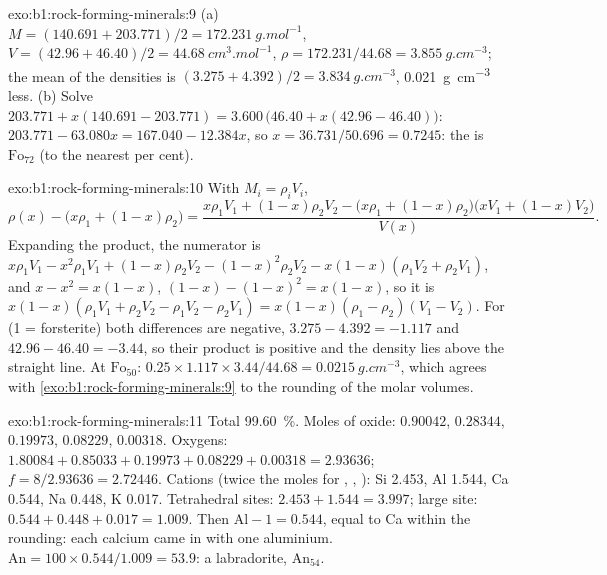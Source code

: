 \begin{solution}{exo:b1:rock-forming-minerals:9}
(a) $M = (140.691 + 203.771)/2 = \qty{172.231}{g.mol^{-1}}$, $V = (42.96 +
46.40)/2 = \qty{44.68}{cm^3.mol^{-1}}$, $\rho = 172.231/44.68 =
\qty{3.855}{g.cm^{-3}}$; the mean of the densities is $(3.275 + 4.392)/2 =
\qty{3.834}{g.cm^{-3}}$, \qty{0.021}{g.cm^{-3}} less. (b) Solve
$203.771 + x(140.691 - 203.771) = 3.600\,\bigl(46.40 + x(42.96 - 46.40)\bigr)$:
$203.771 - 63.080x = 167.040 - 12.384x$, so $x = 36.731/50.696 = 0.7245$: the
 is $\text{Fo}_{72}$ (to the nearest per cent).
\end{solution}

\begin{solution}{exo:b1:rock-forming-minerals:10}
With $M_i = \rho_i V_i$,
\[
  \rho(x) - \bigl(x\rho_1 + (1 - x)\rho_2\bigr)
  = \frac{x\rho_1V_1 + (1 - x)\rho_2V_2 - \bigl(x\rho_1 + (1 - x)\rho_2\bigr)\bigl(xV_1 + (1 - x)V_2\bigr)}{V(x)} .
\]
Expanding the product, the numerator is $x\rho_1V_1 - x^2\rho_1V_1 +
(1 - x)\rho_2V_2 - (1 - x)^2\rho_2V_2 - x(1 - x)(\rho_1V_2 + \rho_2V_1)$, and
$x - x^2 = x(1 - x)$, $(1 - x) - (1 - x)^2 = x(1 - x)$, so it is
$x(1 - x)(\rho_1V_1 + \rho_2V_2 - \rho_1V_2 - \rho_2V_1) =
x(1 - x)(\rho_1 - \rho_2)(V_1 - V_2)$. For  (1 = forsterite) both
differences are negative, $3.275 - 4.392 = -1.117$ and $42.96 - 46.40 =
-3.44$, so their product is positive and the density lies above the straight
line. At $\text{Fo}_{50}$: $0.25\times1.117\times3.44/44.68 =
\qty{0.0215}{g.cm^{-3}}$, which agrees with \cref{exo:b1:rock-forming-minerals:9} to the rounding of the
molar volumes.
\end{solution}

\begin{solution}{exo:b1:rock-forming-minerals:11}
Total \qty{99.60}{\percent}. Moles of oxide:  $0.90042$,
 $0.28344$,  $0.19973$,  $0.08229$,
 $0.00318$. Oxygens: $1.80084 + 0.85033 + 0.19973 + 0.08229 +
0.00318 = 2.93636$; $f = 8/2.93636 = 2.72446$. Cations (twice the moles for
, , ): Si \num{2.453}, Al \num{1.544}, Ca
\num{0.544}, Na \num{0.448}, K \num{0.017}. Tetrahedral sites:
$2.453 + 1.544 = 3.997$; large site: $0.544 + 0.448 + 0.017 = 1.009$. Then
$\mathrm{Al} - 1 = 0.544$, equal to Ca within the rounding: each calcium came
in with one aluminium. $\mathrm{An} = 100\times0.544/1.009 = 53.9$: a
labradorite, $\text{An}_{54}$.
\end{solution}

